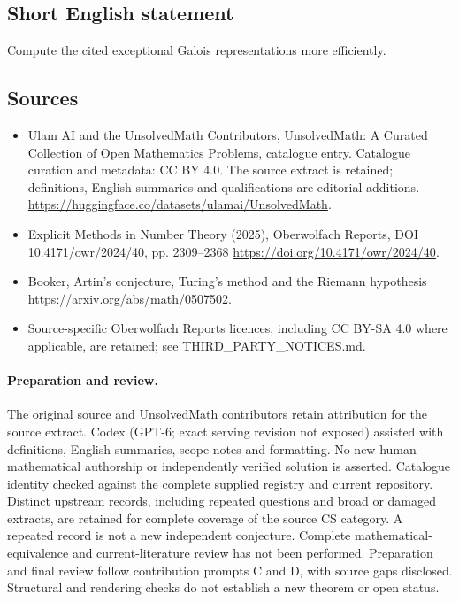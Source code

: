 \documentclass[11pt]{article}
\begin{document}
\subsection{Short English statement}
Compute the cited exceptional Galois representations more efficiently.
\subsection{Sources}
\begin{itemize}
\item[\hypertarget{source:statement:1}{S1}] Ulam AI and the UnsolvedMath Contributors, UnsolvedMath: A Curated Collection of Open Mathematics Problems, catalogue entry. Catalogue curation and metadata: CC BY 4.0. The source extract is retained; definitions, English summaries and qualifications are editorial additions.
\url{https://huggingface.co/datasets/ulamai/UnsolvedMath}.
\item[\hypertarget{source:statement:2}{S2}] Explicit Methods in Number Theory (2025), Oberwolfach Reports, DOI 10.4171/owr/2024/40, pp. 2309--2368
\url{https://doi.org/10.4171/owr/2024/40}.
\item[\hypertarget{source:statement:3}{S3}] Booker, Artin's conjecture, Turing's method and the Riemann hypothesis
\url{https://arxiv.org/abs/math/0507502}.
\item Source-specific Oberwolfach Reports licences, including CC BY-SA 4.0 where applicable, are retained; see THIRD\_PARTY\_NOTICES.md.
\end{itemize}
\paragraph{Preparation and review.}
The original source and UnsolvedMath contributors retain attribution for the source extract. Codex (GPT-6; exact serving revision not exposed) assisted with definitions, English summaries, scope notes and formatting. No new human mathematical authorship or independently verified solution is asserted. Catalogue identity checked against the complete supplied registry and current repository. Distinct upstream records, including repeated questions and broad or damaged extracts, are retained for complete coverage of the source CS category. A repeated record is not a new independent conjecture. Complete mathematical-equivalence and current-literature review has not been performed. Preparation and final review follow contribution prompts C and D, with source gaps disclosed. Structural and rendering checks do not establish a new theorem or open status.
\label{end:statement}
\end{document}
